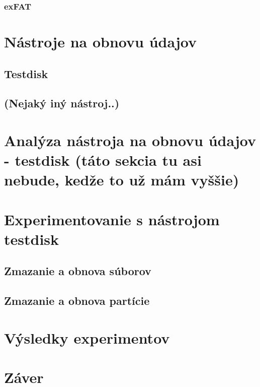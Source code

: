 \documentclass[12pt,oneside,slovak,a4paper]{article}
\begin{document}
\subsubsection{exFAT}

\section{Nástroje na obnovu údajov}
\subsection{Testdisk}
\subsection{(Nejaký iný nástroj..)}

\section{Analýza nástroja na obnovu údajov - testdisk (táto sekcia tu asi nebude, kedže to už mám vyššie)}

\section{Experimentovanie s nástrojom testdisk}
\subsection{Zmazanie a obnova súborov}
\subsection{Zmazanie a obnova partície}

\section{Výsledky experimentov}

\section{Záver}




\end{document}

